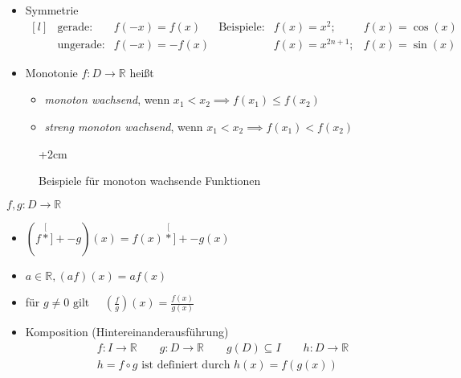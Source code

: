 \begin{definition}
\begin{itemize}

	\item Symmetrie
	\[
	\begin{matrix}[l]
		&\text{gerade:}		&f(-x) = f(x)	&\text{Beispiele:}	&f(x) = x^2; 	&f(x) = \cos(x) \\
		&\text{ungerade:}	&f(-x) = -f(x) &             &f(x) = x^{2n+1};	&f(x) = \sin(x)
	\end{matrix}
	\]

	\item Monotonie \newline \(f:D\rightarrow \mathbb{R}\) heißt
	\begin{itemize}
		\item \emph{monoton wachsend}, wenn \(x_1<x_2 \implies f(x_1) \leq f(x_2)\)
		\item \emph{streng monoton wachsend},
			  wenn \(x_1<x_2 \implies f(x_1) < f(x_2)\)
	\end{itemize}
\end{itemize}

\begin{figure}[h]
	\advance\leftskip+2cm
\caption{Beispiele für monoton wachsende Funktionen}
\end{figure}

\end{definition}

\begin{definition}[Operationen]
\( f,g: D \rightarrow \mathbb{R} \)
\begin{itemize}
	\item \((f \stackrel[\ast]{+}{-} g)(x) = f(x)  \stackrel[\ast]{+}{-} g(x) \)
	\item \(a \in \mathbb{R}, (af)(x)=af(x)\)
	\item für \(\displaystyle g \neq 0 \text{ gilt }\quad \left(\frac{f}{g}\right)(x)=\frac{f(x)}{g(x)}\)
	\item 	Komposition (Hintereinanderausführung)
	\begin{align*} &f:I\rightarrow\mathbb{R}\qquad  g:D\rightarrow\mathbb{R}\qquad g(D) \subseteq I\qquad h:D\rightarrow\mathbb{R} \\ &h = f \circ g  \text{ ist definiert durch } h(x) = f( g(x) )
	\end{align*}
\end{itemize}

\end{definition}

